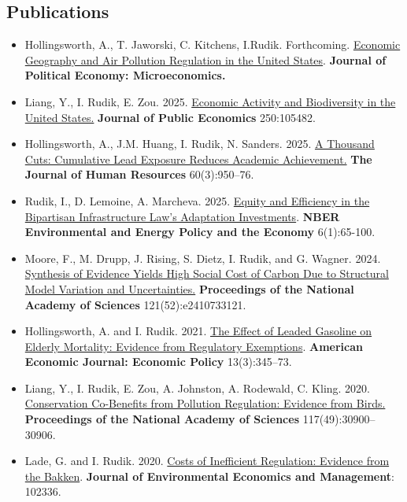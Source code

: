 \documentclass[11pt]{res} %
\begin{document}
\begin{resume}
\subsection{Publications}
\begin{itemize}
	\item[] Hollingsworth, A., T. Jaworski, C. Kitchens, I.Rudik. Forthcoming. \href{https://osf.io/preprints/socarxiv/x6fuw/}{Economic Geography and Air Pollution Regulation in the United States}. \textbf{Journal of Political Economy: Microeconomics.}
	\item[] Liang, Y., I. Rudik, E. Zou. 2025. \href{https://www.sciencedirect.com/science/article/pii/S004727272500180X}{Economic Activity and Biodiversity in the United States.} \textbf{Journal of Public Economics} 250:105482.
	\item[] Hollingsworth, A., J.M. Huang, I. Rudik, N. Sanders. 2025. \href{https://www.nber.org/papers/w28250}{A Thousand Cuts: Cumulative Lead Exposure Reduces Academic Achievement.} \textbf{The Journal of Human Resources} 60(3):950--76.
	\item[] Rudik, I., D. Lemoine, A. Marcheva. 2025. \href{https://www.nber.org/books-and-chapters/environmental-and-energy-policy-and-economy-volume-6/equity-and-efficiency-bipartisan-infrastructure-laws-adaptation-investments}{Equity and Efficiency in the Bipartisan Infrastructure Law’s Adaptation Investments}. \textbf{NBER Environmental and Energy Policy and the Economy} 6(1):65-100.
	\item[] Moore, F., M. Drupp, J. Rising, S. Dietz, I. Rudik, and G. Wagner. 2024. \href{https://www.pnas.org/doi/10.1073/pnas.2410733121}{Synthesis of Evidence Yields High Social Cost of Carbon Due to Structural Model Variation and Uncertainties.} \textbf{Proceedings of the National Academy of Sciences} 121(52):e2410733121.
	\item[] Hollingsworth, A. and I. Rudik. 2021. \href{https://osf.io/preprints/socarxiv/rdy6g}{The Effect of Leaded Gasoline on Elderly Mortality: Evidence from Regulatory Exemptions}. \textbf{American Economic Journal: Economic Policy} 13(3):345--73.
	\item[] Liang, Y., I. Rudik, E. Zou, A. Johnston, A. Rodewald, C. Kling. 2020. \href{https://www.pnas.org/content/early/2020/11/23/2013568117}{Conservation Co-Benefits from Pollution Regulation: Evidence from Birds.} \textbf{Proceedings of the National Academy of Sciences} 117(49):30900--30906.
	\item[] Lade, G. and I. Rudik. 2020. \href{https://papers.ssrn.com/sol3/papers.cfm?abstract_id=3086728}{Costs of Inefficient Regulation: Evidence from the Bakken}. \textbf{Journal of Environmental Economics and Management}: 102336.

\end{itemize}
\end{resume}
\end{document}

